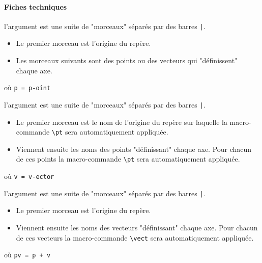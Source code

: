 \documentclass[12pt,a4paper]{article}
\theoremstyle{definition}
\begin{document}
\paragraph{Fiches techniques}



\IDarg{} l'argument est une suite de "morceaux" séparés par des barres \verb+|+.

\begin{itemize}[topsep=0pt]
	\item Le premier morceau est l'origine du repère.

	\item Les morceaux suivants sont des points ou des vecteurs qui "définissent" chaque axe.
\end{itemize}


\bigskip

 où \quad \verb+p = p-oint+

\IDarg{} l'argument est une suite de "morceaux" séparés par des barres \verb+|+.

\begin{itemize}[topsep=0pt]
	\item Le premier morceau est le nom de l'origine du repère sur laquelle la macro-commande \verb+\pt+ sera automatiquement appliquée.

	\item Viennent ensuite les noms des points "définissant" chaque axe. Pour chacun de ces points la macro-commande \verb+\pt+ sera automatiquement appliquée.
\end{itemize}


\bigskip

 où \quad \verb+v = v-ector+

\IDarg{} l'argument est une suite de "morceaux" séparés par des barres \verb+|+.

\begin{itemize}[topsep=0pt]
	\item Le premier morceau est l'origine du repère.

	\item Viennent ensuite les noms des vecteurs "définissant" chaque axe. Pour chacun de ces vecteurs la macro-commande \verb+\vect+ sera automatiquement appliquée.
\end{itemize}


\bigskip

 où \quad \verb&pv = p + v&
\end{document}
